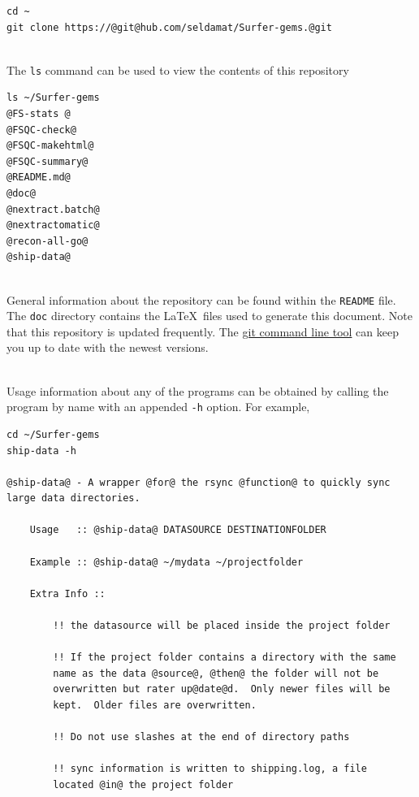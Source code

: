 \documentclass[paper=a4, fontsize=11pt]{scrartcl} %
\numberwithin{equation}{section} %
\numberwithin{figure}{section} %
\numberwithin{table}{section} %
\begin{document}
\begin{lstlisting}
cd ~
git clone https://@git@hub.com/seldamat/Surfer-gems.@git
\end{lstlisting}

~\\The \texttt{ls} command can be used to view the contents of this repository

\begin{lstlisting}
ls ~/Surfer-gems
@FS-stats @
@FSQC-check@
@FSQC-makehtml@
@FSQC-summary@
@README.md@
@doc@
@nextract.batch@
@nextractomatic@
@recon-all-go@
@ship-data@
\end{lstlisting}

~\\General information about the repository can be found within the \texttt{README} file.  The \texttt{doc} directory contains the \LaTeX\  files used to generate this document.  Note that this repository is updated frequently.  The \href{http://rogerdudler.github.io/git-guide/}{git command line tool} can keep you up to date with the newest versions.

~\\Usage information about any of the programs can be obtained by calling the program by name with an appended \texttt{-h} option.  For example,

\begin{lstlisting}
cd ~/Surfer-gems
ship-data -h

@ship-data@ - A wrapper @for@ the rsync @function@ to quickly sync large data directories.

	Usage   :: @ship-data@ DATASOURCE DESTINATIONFOLDER

	Example :: @ship-data@ ~/mydata ~/projectfolder

	Extra Info ::

		!! the datasource will be placed inside the project folder

		!! If the project folder contains a directory with the same
	   	name as the data @source@, @then@ the folder will not be
	   	overwritten but rater up@date@d.  Only newer files will be
	   	kept.  Older files are overwritten.

		!! Do not use slashes at the end of directory paths

		!! sync information is written to shipping.log, a file
		located @in@ the project folder
\end{lstlisting}
\end{document}
